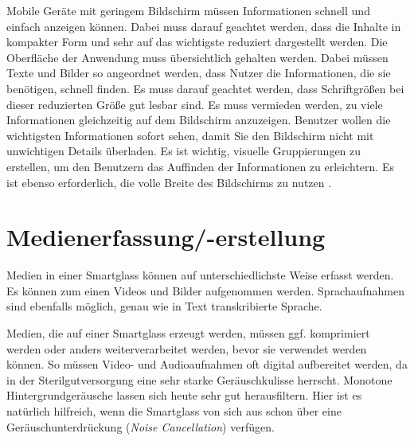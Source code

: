 Mobile Geräte mit geringem Bildschirm müssen Informationen schnell und einfach anzeigen können. Dabei muss darauf geachtet werden, dass die Inhalte in kompakter Form und sehr auf das wichtigste reduziert dargestellt werden. Die Oberfläche der Anwendung muss übersichtlich gehalten werden. Dabei müssen Texte und Bilder so angeordnet werden, dass Nutzer die Informationen, die sie benötigen, schnell finden. Es muss darauf geachtet werden, dass Schriftgrößen bei dieser reduzierten Größe gut lesbar sind. Es muss vermieden werden, zu viele Informationen gleichzeitig auf dem Bildschirm anzuzeigen. Benutzer wollen die wichtigsten Informationen sofort sehen, damit Sie den Bildschirm nicht mit unwichtigen Details überladen. 
Es ist wichtig, visuelle Gruppierungen zu erstellen, um den Benutzern das Auffinden der Informationen zu erleichtern. Es ist ebenso erforderlich, die volle Breite des Bildschirms zu nutzen \cite{Apple2018c, Google2018}.
%
%
%
%
%
%
\section{Medienerfassung/-erstellung}
\label{sec:Medienerfassung_-erstellung}
Medien in einer Smartglass können auf unterschiedlichste Weise erfasst werden. Es können zum einen Videos und Bilder aufgenommen werden. Sprachaufnahmen sind ebenfalls möglich, genau wie in Text transkribierte Sprache. 

Medien, die auf einer Smartglass erzeugt werden, müssen ggf. komprimiert werden oder anders weiterverarbeitet werden, bevor sie verwendet werden können. So müssen Video- und Audioaufnahmen oft digital aufbereitet werden, da in der Sterilgutversorgung eine sehr starke Geräuschkulisse herrscht. Monotone Hintergrundgeräusche lassen sich heute sehr gut herausfiltern. Hier ist es natürlich hilfreich, wenn die Smartglass von sich aus schon über eine Geräuschunterdrückung (\emph{Noise Cancellation}) verfügen.
%
